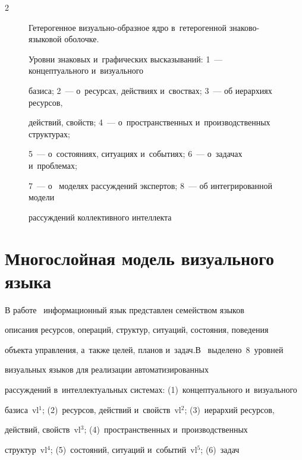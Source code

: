 \begin{multicols}{2}
\begin{figure}
\vspace*{6pt}





\noindent


{\small Гетерогенное визуально-образное ядро в~гетерогенной знаково-языковой оболочке. 


Уровни знаковых и~графических высказываний: {1}~--- концептуального и~визуального 


базиса; {2}~--- о~ресурсах, действиях и~своствах; 3~--- об иерархиях ресурсов, 


действий, свойств; {4}~--- о~пространственных и~производственных структурах; 


{5}~--- о~со\-сто\-яни\-ях, ситуациях и~событиях; {6}~--- о~задачах и~проблемах; 


{7}~--- о~ моделях рассуждений экспертов; {8}~--- об интегрированной модели 


рассуждений коллективного интеллекта}


\vspace*{6pt}


\end{figure}





  


\section{Многослойная модель визуального языка}





  В работе~\cite{11-ls} информационный язык пред\-став\-лен семейством языков 


описания ресурсов, операций, структур, ситуаций, состояния, поведения


объекта управления, а~также целей, планов и~задач.\linebreak  В~\cite{12-ls} выделено~8~уровней 


визуальных языков для реализации автоматизированных 


рас\-суж\-де\-ний в~интеллектуальных системах: (1)~концептуального и~визуального 


базиса~vl$^1$; (2)~ресурсов, действий и~свойств~vl$^2$; (3)~иерархий ресурсов, 


действий, свойств~vl$^3$; (4)~пространственных и~производственных 


структур~vl$^4$; (5)~состояний, ситуаций и~событий~vl$^5$; (6)~задач  



\end{multicols}
